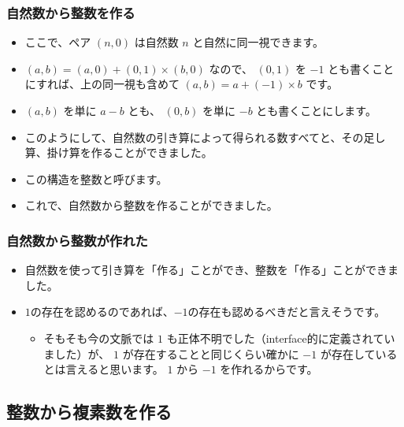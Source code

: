 \documentclass[dvipdfmx]{beamer}
\begin{document}
  \begin{frame}
    \frametitle{自然数から整数を作る}

    \begin{itemize}
      \item ここで、ペア $(n,0)$ は自然数 $n$ と自然に同一視できます。
      \item $(a,b) = (a,0) + (0,1) \times (b,0)$ なので、 $(0,1)$ を $-1$ とも書くことにすれば、上の同一視も含めて $(a,b) = a + (-1) \times b$ です。
      \item $(a,b)$ を単に $a-b$ とも、 $(0,b)$ を単に $-b$ とも書くことにします。
      \item このようにして、自然数の引き算によって得られる数すべてと、その足し算、掛け算を作ることができました。
      \item この構造を整数と呼びます。
      \item これで、自然数から整数を作ることができました。
    \end{itemize}

  \end{frame}

  \begin{frame}
    \frametitle{自然数から整数が作れた}

    \begin{itemize}
      \item 自然数を使って引き算を「作る」ことができ、整数を「作る」ことができました。
      \item $1$の存在を認めるのであれば、$-1$の存在も認めるべきだと言えそうです。
      \begin{itemize}
        \item そもそも今の文脈では $1$ も正体不明でした（interface的に定義されていました）が、 $1$ が存在することと同じくらい確かに $-1$ が存在しているとは言えると思います。 $1$ から $-1$ を作れるからです。
      \end{itemize}
    \end{itemize}

  \end{frame}

  \subsection{整数から複素数を作る}
\end{document}
